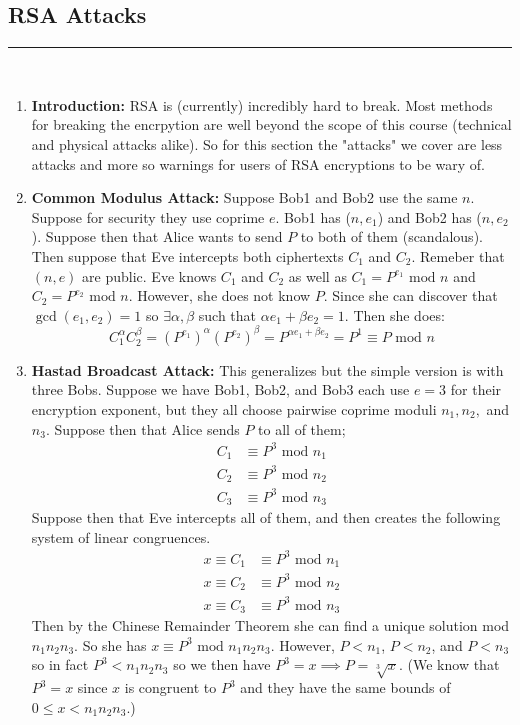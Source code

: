 \documentclass[class=article, crop=false]{standalone}
\begin{document}
\subsection{RSA Attacks}
\rule{\textwidth}{1pt}\\
\begin{enumerate}
	\item \textbf{Introduction:} RSA is (currently) incredibly hard to break.
	Most methods for breaking the encrpytion are well beyond the scope of this course (technical and physical attacks alike).
	So for this section the "attacks" we cover are less attacks and more so warnings for users of
	RSA encryptions to be wary of.

	\item \textbf{Common Modulus Attack:}
	Suppose Bob1 and Bob2 use the same $n$. Suppose for security they use
	coprime $e$. Bob1 has ($n,e_1$) and Bob2 has ($n,e_2$). Suppose then
	that Alice wants to send $P$ to both of them (scandalous).
	Then suppose that Eve intercepts both ciphertexts $C_1$ and $C_2$.
	Remeber that $(n,e)$ are public.
	Eve knows $C_1$ and $C_2$ as well as $C_1=P^{e_1} \mbox{ mod }n$ and $C_2=P^{e_2}\mbox{ mod }n$.
	However, she does not know $P$. Since she can discover that $\gcd(e_1, e_2)=1$
	so $\exists\alpha,\beta$ such that $\alpha e_1 + \beta e_2=1$.
	Then she does:
	$$C_1^{\alpha}C_2^{\beta} = (P^{e_1})^{\alpha} (P^{e_2})^{\beta} = P^{\alpha e_1 + \beta e_2} = P^1
	\equiv P\mbox{ mod }n$$

	\item \textbf{Hastad Broadcast Attack:}
	This generalizes but the simple version is with three Bobs.
	Suppose we have Bob1, Bob2, and Bob3 each use $e=3$ for their encryption
	exponent, but they all choose pairwise coprime moduli $n_1, n_2,$ and $n_3$.
	Suppose then that Alice sends $P$ to all of them;
	\begin{align*}
		C_1 &\equiv P^3\mbox{ mod }n_1 \\
		C_2 &\equiv P^3\mbox{ mod }n_2 \\
		C_3 &\equiv P^3\mbox{ mod }n_3
	\end{align*}
	Suppose then that Eve intercepts all of them, and then creates the following system of
	linear congruences.
	\begin{align*}
		x\equiv C_1 &\equiv P^3\mbox{ mod }n_1 \\
		x\equiv C_2 &\equiv P^3\mbox{ mod }n_2 \\
		x\equiv C_3 &\equiv P^3\mbox{ mod }n_3
	\end{align*}
	Then by the Chinese Remainder Theorem she can find a unique solution
	mod $n_1 n_2 n_3$. So she has $x\equiv P^3\mbox{ mod }n_1n_2n_3$.
	However, $P<n_1$, $P<n_2$, and $P<n_3$ so in fact $P^3<n_1n_2n_3$ so we then have
	$P^3=x\implies P=\sqrt[3]{x}$.
	(We know that $P^3=x$ since $x$ is congruent to $P^3$ and they have the same bounds
	of $0\leq x <n_1n_2n_3$.)


\end{enumerate}
\end{document}
